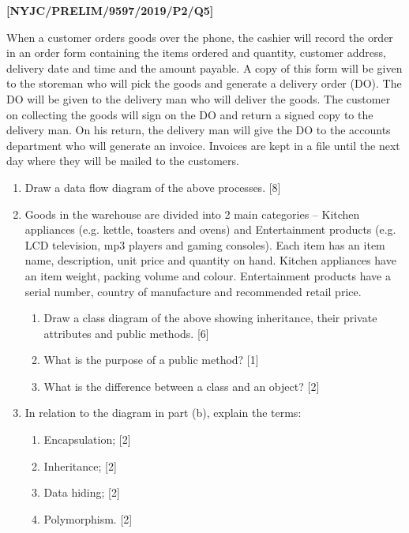 \item \textbf{{[}NYJC/PRELIM/9597/2019/P2/Q5{]} }

When a customer orders goods over the phone, the cashier will record
the order in an order form containing the items ordered and quantity,
customer address, delivery date and time and the amount payable. A
copy of this form will be given to the storeman who will pick the
goods and generate a delivery order (DO). The DO will be given to
the delivery man who will deliver the goods. The customer on collecting
the goods will sign on the DO and return a signed copy to the delivery
man. On his return, the delivery man will give the DO to the accounts
department who will generate an invoice. Invoices are kept in a file
until the next day where they will be mailed to the customers.
\begin{enumerate}
\item Draw a data flow diagram of the above processes.\hfill{} {[}8{]} 
\item Goods in the warehouse are divided into 2 main categories -- Kitchen
appliances (e.g. kettle, toasters and ovens) and Entertainment products
(e.g. LCD television, mp3 players and gaming consoles). Each item
has an item name, description, unit price and quantity on hand. Kitchen
appliances have an item weight, packing volume and colour. Entertainment
products have a serial number, country of manufacture and recommended
retail price.
\begin{enumerate}
\item Draw a class diagram of the above showing inheritance, their private
attributes and public methods.\hfill{} {[}6{]}
\item What is the purpose of a public method?\hfill{} {[}1{]}
\item What is the difference between a class and an object?\hfill{} {[}2{]}
\end{enumerate}
\item In relation to the diagram in part (b), explain the terms: 
\begin{enumerate}
\item Encapsulation; \hfill{}{[}2{]}
\item Inheritance;\hfill{} {[}2{]}
\item Data hiding; \hfill{}{[}2{]}
\item Polymorphism. \hfill{}{[}2{]}
\end{enumerate}
\end{enumerate}